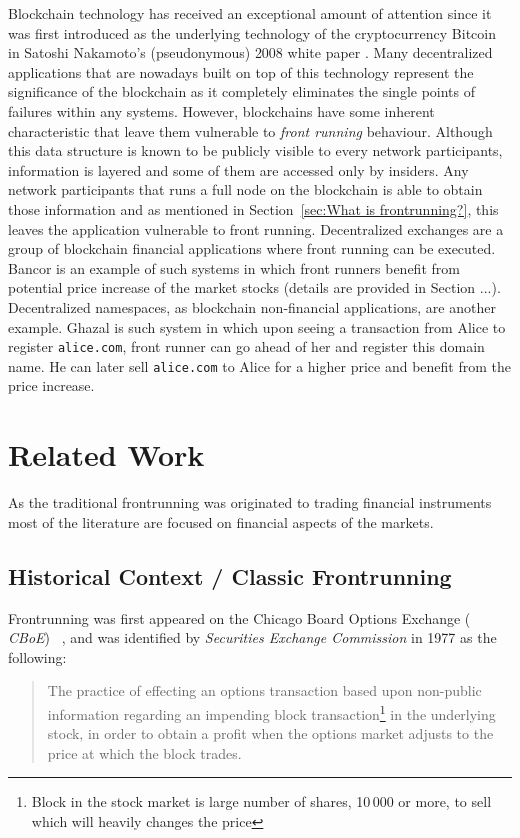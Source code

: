 Blockchain technology has received an exceptional amount of attention since it was first introduced as the underlying technology of the cryptocurrency Bitcoin in Satoshi Nakamoto's (pseudonymous) 2008 white paper \cite{nakamoto2008bitcoin}. Many decentralized applications that are nowadays built on top of this technology represent the significance of the blockchain as it completely eliminates the single points of failures within any systems. However, blockchains have some inherent characteristic that leave them vulnerable to \emph{front running} behaviour. Although this data structure is known to be publicly visible to every network participants, information is layered  and some of them are accessed only by insiders. Any network participants that runs a full node on the blockchain is able to obtain those information and as mentioned in Section~\ref{sec:What is frontrunning?}, this leaves the application vulnerable to front running. Decentralized exchanges are a group of blockchain financial applications where front running can be executed. Bancor \cite{hertzog2017bancor} is an example of such systems in which front runners benefit from potential price increase of the market stocks (details are provided in Section ...). Decentralized namespaces, as blockchain non-financial applications, are another example. Ghazal \cite{moosavighazal} is such system in which upon seeing a transaction from Alice to register \texttt{alice.com}, front runner can go ahead of her and register this domain name. He can later sell \texttt{alice.com} to Alice for a higher price and benefit from the price increase.

\section{Related Work}
As the traditional frontrunning was originated to trading financial instruments most of the literature are focused on financial aspects of the markets. %


\subsection{Historical Context / Classic Frontrunning}
Frontrunning was first appeared on the Chicago Board Options Exchange ( \textit{CBoE}) ~\cite{markham1988front}, and was identified by \textit{Securities Exchange Commission} in 1977 as the following:
\begin{quote}
The practice of effecting an options transaction based upon non-public information regarding an impending block transaction\footnote{Block in the stock market is large number of shares, 10\,000 or more, to sell which will heavily changes the price} in the underlying stock, in order to obtain a profit when the options market adjusts to the price at which the block trades. ~\cite{sec1978optionsmarket}
\end{quote} 


